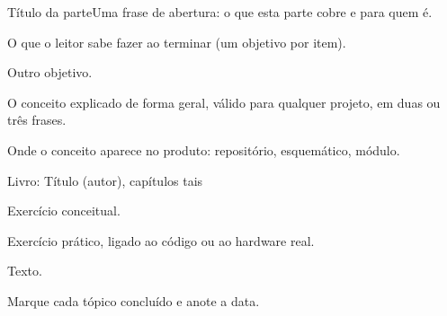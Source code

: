 \documentclass{nro-apostila}
\begin{document}
\begin{parte}{Título da parte}{Uma frase de abertura: o que esta parte cobre e para quem é.}
  \item O que o leitor sabe fazer ao terminar (um objetivo por item).
  \item Outro objetivo.
\end{parte}


O conceito explicado de forma geral, válido para qualquer projeto, em duas ou três frases.

\begin{noproduto}
  Onde o conceito aparece no produto: repositório, esquemático, módulo.
\end{noproduto}

\begin{paraestudar}
  \item {}
  \item Livro: Título (autor), capítulos tais
\end{paraestudar}

\begin{pratique}
  \item Exercício conceitual.
  \item Exercício prático, ligado ao código ou ao hardware real.
\end{pratique}

Texto.

\begin{glossario}
\end{glossario}

Marque cada tópico concluído e anote a data.
\par\vspace{2mm}
\fichaprogresso

\end{document}
